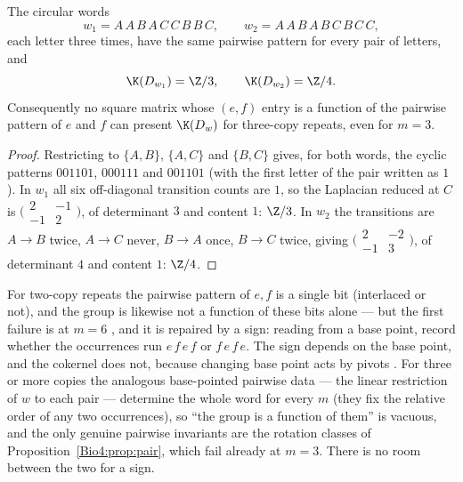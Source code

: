 \begin{proposition}\label{Bio4:prop:pair}
The circular words
\[
w_1=A\,A\,B\,A\,C\,C\,B\,B\,C,\qquad w_2=A\,A\,B\,A\,B\,C\,B\,C\,C,
\]
each letter three times, have the same pairwise pattern for every pair of letters, and
\[
\K(D_{w_1})=\Z/3,\qquad \K(D_{w_2})=\Z/4 .
\]
Consequently no square matrix whose $(e,f)$ entry is a function of the pairwise pattern
of $e$ and $f$ can present $\K(D_w)$ for three-copy repeats, even for $m=3$.
\end{proposition}

\begin{proof}
Restricting to $\{A,B\}$, $\{A,C\}$ and $\{B,C\}$ gives, for both words, the cyclic
patterns $001101$, $000111$ and $001101$ (with the first letter of the pair written as
$1$). In $w_1$ all six off-diagonal transition counts are $1$, so the Laplacian reduced
at $C$ is $\bigl(\begin{smallmatrix}2&-1\\-1&2\end{smallmatrix}\bigr)$, of determinant
$3$ and content $1$: $\Z/3$. In $w_2$ the transitions are $A\to B$ twice, $A\to C$
never, $B\to A$ once, $B\to C$ twice, giving
$\bigl(\begin{smallmatrix}2&-2\\-1&3\end{smallmatrix}\bigr)$, of determinant $4$ and
content $1$: $\Z/4$.
\end{proof}

\begin{remark}\label{Bio4:rem:sharper}
For two-copy repeats the pairwise pattern of $e,f$ is a single bit (interlaced or not),
and the group is likewise not a function of these bits alone --- but the first failure
is at $m=6$ \cite[Rem.~6.7]{MMN}, and it is repaired by a sign: reading from a base
point, record whether the occurrences run $e\,f\,e\,f$ or $f\,e\,f\,e$. The sign depends
on the base point, and the cokernel does not, because changing base point acts by
pivots \cite[Lem.~4.8]{MMN}. For three or more copies the analogous base-pointed pairwise
data --- the linear restriction of $w$ to each pair --- determine the whole word for
every $m$ (they fix the relative order of any two occurrences), so ``the group is a
function of them'' is vacuous, and the only genuine pairwise invariants are the rotation
classes of Proposition~\ref{Bio4:prop:pair}, which fail already at $m=3$. There is no room
between the two for a sign.
\end{remark}

